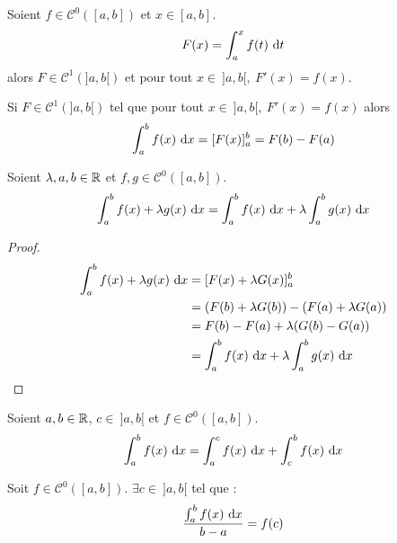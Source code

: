 \begin{theorem}
	Soient $f \in \mathcal{C}^0([a, b])$ et $x \in [a, b]$.
	\begin{align*}
		F(x) = \int_a^x f(t) \ \diffd t
	\end{align*}
	alors $F \in \mathcal{C}^1(]a, b[)$ et pour tout $x \in \ ]a, b[,\ F'(x) = f(x)$.    
\end{theorem}

\begin{corollary}
    Si $F \in \mathcal{C}^1(]a, b[)$ tel que pour tout $x \in \ ]a, b[,\ F'(x) = f(x)$ alors
	\begin{align*}
		\int_a^b f(x) \ \diffd x = [F(x)]_a^b = F(b) - F(a) 
	\end{align*}
\end{corollary}

\begin{proposition}
	Soient $\lambda, a, b \in \mathbb{R}$ et $f, g \in \mathcal{C}^0([a, b])$.
	\begin{align*}
		\int_a^b f(x) + \lambda g(x) \ \diffd x = \int_a^b f(x) \ \diffd x + \lambda \int_a^b g(x) \ \diffd x 
	\end{align*}
\end{proposition}

\begin{proof}
    \begin{align*}
        \int_{a}^{b} f(x) + \lambda g(x) \ \diffd x &= [F(x) + \lambda G(x)]_a^b \\
                                                    &= (F(b) + \lambda G(b)) - (F(a) + \lambda G(a)) \\
                                                    &= F(b) - F(a) + \lambda (G(b) - G(a)) \\
                                                    &= \int_{a}^{b} f(x) \ \diffd x + \lambda \int_{a}^{b} g(x) \ \diffd x
    \end{align*}
\end{proof}

\begin{proposition}
	Soient $a, b \in \mathbb{R}$, $c \in \ ]a, b[$ et $f \in \mathcal{C}^0([a, b])$.
	\begin{align*}
		\int_a^b f(x) \ \diffd x = \int_a^c f(x) \ \diffd x + \int_c^b f(x) \ \diffd x
	\end{align*}
\end{proposition}

\begin{theorem}
    Soit $f \in \mathcal{C}^0([a, b])$. $\exists c \in \ ]a, b[$  tel que :
    \[ \frac{\int_{a}^{b} f(x) \ \diffd x}{b - a} = f(c) \]
\end{theorem}

